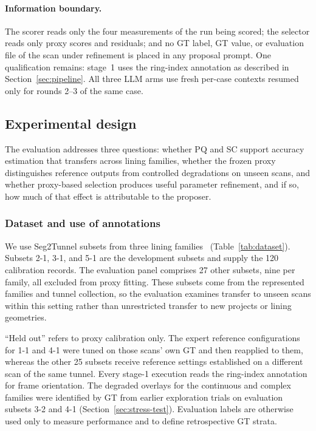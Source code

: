 \documentclass[a4paper,fleqn]{cas-dc}
\begin{document}
\paragraph{Information boundary.}
The scorer reads only the four measurements of the run being scored; the selector reads only proxy scores and residuals; and no GT label, GT value, or evaluation file of the scan under refinement is placed in any proposal prompt. One qualification remains: stage~1 uses the ring-index annotation as described in Section~\ref{sec:pipeline}. All three LLM arms use fresh per-case contexts resumed only for rounds 2--3 of the same case.

\subsection{Experimental design}
\label{sec:exp-setup}

The evaluation addresses three questions: whether PQ and SC support accuracy estimation that transfers across lining families, whether the frozen proxy distinguishes reference outputs from controlled degradations on unseen scans, and whether proxy-based selection produces useful parameter refinement, and if so, how much of that effect is attributable to the proposer.

\subsubsection{Dataset and use of annotations}
\label{sec:dataset}

We use Seg2Tunnel subsets from three lining families~\cite{lin2024seg2tunnel} (Table~\ref{tab:dataset}). Subsets 2-1, 3-1, and 5-1 are the development subsets and supply the 120 calibration records. The evaluation panel comprises 27 other subsets, nine per family, all excluded from proxy fitting. These subsets come from the represented families and tunnel collection, so the evaluation examines transfer to unseen scans within this setting rather than unrestricted transfer to new projects or lining geometries.

``Held out'' refers to proxy calibration only. The expert reference configurations for 1-1 and 4-1 were tuned on those scans' own GT and then reapplied to them, whereas the other 25 subsets receive reference settings established on a different scan of the same tunnel. Every stage-1 execution reads the ring-index annotation for frame orientation. The degraded overlays for the continuous and complex families were identified by GT from earlier exploration trials on evaluation subsets 3-2 and 4-1 (Section~\ref{sec:stress-test}). Evaluation labels are otherwise used only to measure performance and to define retrospective GT strata.
\end{document}
